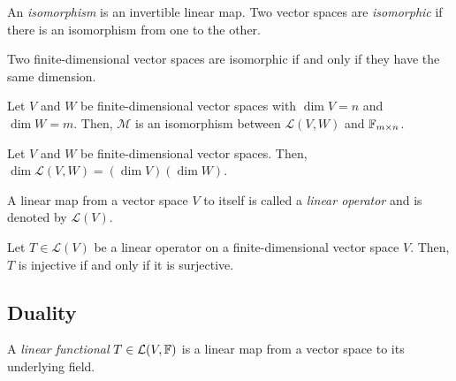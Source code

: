 \documentclass{article}
\begin{document}
\begin{definition}[Isomorphism]
  An \emph{isomorphism} is an invertible linear map.
  Two vector spaces are \emph{isomorphic} if there is an isomorphism from one to the other.
\end{definition}

\begin{theorem}
  Two finite-dimensional vector spaces are isomorphic if and only if they have the same dimension.
\end{theorem}

\begin{theorem}
  Let $V$ and $W$ be finite-dimensional vector spaces with $\dim V = n$ and $\dim W = m$.
  Then, $\mathcal{M}$ is an isomorphism between $\mathcal{L}(V, W)$ and $\mathbb{F}_{m \times n}$.
\end{theorem}

\begin{corollary}[$\dim \mathcal{L}(V, W) = (\dim V)(\dim W)$]
  Let $V$ and $W$ be finite-dimensional vector spaces.
  Then, $\dim \mathcal{L}(V, W) = (\dim V)(\dim W)$.
\end{corollary}

\begin{definition}
  A linear map from a vector space $V$ to itself is called a \emph{linear operator} and is denoted by $\mathcal{L}(V)$.
\end{definition}

\begin{theorem}
  Let $T \in \mathcal{L}(V)$ be a linear operator on a finite-dimensional vector space $V$.
  Then, $T$ is injective if and only if it is surjective.
\end{theorem}

\subsection{Duality}

\begin{definition}
  A \emph{linear functional} $T \in \mathcal{L}(V, \mathbb{F})$ is a linear map from a vector space to its underlying field.
\end{definition}
\end{document}
